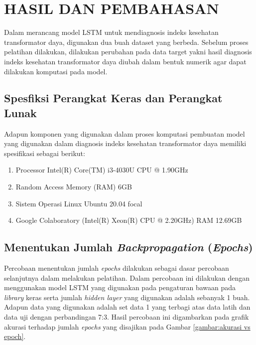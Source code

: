 \chapter{HASIL DAN PEMBAHASAN}
\label{BAB4:hasil}


Dalam merancang model LSTM untuk mendiagnosis indeks kesehatan transformator daya, digunakan dua buah dataset yang berbeda. Sebelum proses pelatihan dilakukan, dilakukan perubahan pada data target yakni hasil diagnosis indeks kesehatan transformator daya diubah dalam bentuk numerik agar dapat dilakukan komputasi pada model. 
\section{Spesfiksi Perangkat Keras dan Perangkat Lunak}
Adapun komponen yang digunakan dalam proses komputasi pembuatan model yang digunakan dalam diagnosis indeks kesehatan transformator daya memiliki spesifikasi sebagai berikut:
\begin{enumerate}
	\setlength{\itemsep}{0pt}%
	\item Processor Intel(R) Core(TM) i3-4030U CPU @ 1.90GHz
	\item Random Access Memory (RAM) 6GB
	\item Sistem Operasi Linux Ubuntu 20.04 focal
	\item Google Colaboratory (Intel(R) Xeon(R) CPU @ 2.20GHz) RAM 12.69GB
\end{enumerate}

\section{Menentukan Jumlah \textit{Backpropagation} (\textit{Epochs})}
Percobaan menentukan jumlah \textit{epochs} dilakukan sebagai dasar percobaan selanjutnya dalam melakukan pelatihan. Dalam percobaan ini dilakukan dengan menggunakan model LSTM yang digunakan pada pengaturan bawaan pada \textit{library} keras serta jumlah \textit{hidden layer} yang digunakan adalah sebanyak 1 buah. Adapun data yang digunakan adalah set data 1 yang terbagi atas data latih dan data uji dengan perbandingan 7:3. Hasil percobaan ini digambarkan pada grafik akurasi terhadap jumlah \textit{epochs} yang disajikan pada Gambar \ref{gambar:akurasi vs epoch}. 

\begin{minipage}{\textwidth}
	\centering
	\label{gambar:akurasi vs epoch}
\end{minipage}

